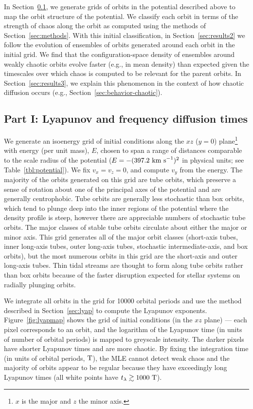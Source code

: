 \documentclass[letterpaper,12pt,preprint]{aastex}
\newcommand{\periods}{\ensuremath{{\rm T}}}
\begin{document}
In Section~\ref{sec:results1}, we generate grids of orbits in the potential described above to map the orbit structure of the potential. We classify each orbit in terms of the strength of chaos along the orbit as computed using the methods of Section~\ref{sec:methods}. With this initial classification, in Section~\ref{sec:results2} we follow the evolution of ensembles of orbits generated around each orbit in the initial grid. We find that the configuration-space density of ensembles around weakly chaotic orbits evolve faster (e.g., in mean density) than expected given the timescales over which chaos is computed to be relevant for the parent orbits. In Section~\ref{sec:results3}, we explain this phenomenon in the context of how chaotic diffusion occurs (e.g., Section~\ref{sec:behavior-chaotic}).

\subsection{Part I: Lyapunov and frequency diffusion times}\label{sec:results1}

We generate an isoenergy grid of initial conditions along the $xz$ ($y=0$) plane\footnote{$x$ is the major and $z$ the minor axis.} with energy (per unit mass), $E$, chosen to span a range of distances comparable to the scale radius of the potential ($E=-(397.2~{\rm km~s}^{-1})^2$ in physical units; see Table~\ref{tbl:potential}). We fix $v_x = v_z = 0$, and compute $v_y$ from the energy. The majority of the orbits generated on this grid are tube orbits, which preserve a sense of rotation about one of the principal axes of the potential and are generally centrophobic. Tube orbits are generally less stochastic than box orbits, which tend to plunge deep into the inner regions of the potential where the density profile is steep, however there are appreciable numbers of stochastic tube orbits. The major classes of stable tube orbits circulate about either the major or minor axis. This grid generates all of the major orbit classes (short-axis tubes, inner long-axis tubes, outer long-axis tubes, stochastic intermediate-axis, and box orbits), but the most numerous orbits in this grid are the short-axis and outer long-axis tubes. Thin tidal streams are thought to form along tube orbits rather than box orbits because of the faster disruption expected for stellar systems on radially plunging orbits.

We integrate all orbits in the grid for 10000 orbital periods and use the method described in Section~\ref{sec:lyap} to compute the Lyapunov exponents. Figure~\ref{fig:lyapmap} shows the grid of initial conditions (in the $xz$ plane) --- each pixel corresponds to an orbit, and the logarithm of the Lyapunov time (in units of number of orbital periods) is mapped to greyscale intensity. The darker pixels have shorter Lyapunov times and are more chaotic. By fixing the integration time (in units of orbital periods, $\periods$), the MLE cannot detect weak chaos and the majority of orbits appear to be regular because they have exceedingly long Lyapunov times (all white points have $t_\lambda \gtrsim 1000~\periods$). 
\end{document}
